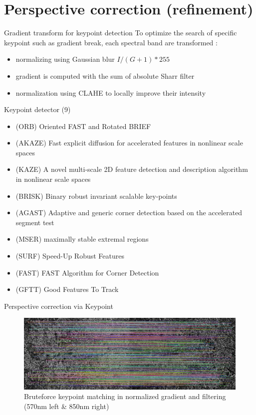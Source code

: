 \documentclass{beamer}
\begin{document}
	\section{Perspective correction (refinement)}
		\begin{frame}{Gradient transform for keypoint detection}
			To optimize the search of specific keypoint such as gradient break,
			each spectral band are transformed :
			\begin{itemize}
				\item normalizing using Gaussian blur $I/(G+1)*255$ 
				\item gradient is computed with the sum of absolute Sharr filter
				\item normalization using CLAHE to locally improve their intensity
			\end{itemize}
		\end{frame}
	
		\begin{frame}{Keypoint detector (9)}
			\begin{itemize}
				\item (ORB) Oriented FAST and Rotated BRIEF
				\item (AKAZE) Fast explicit diffusion for accelerated features in nonlinear scale spaces
				\item (KAZE) A novel multi-scale 2D feature detection and description algorithm in nonlinear scale spaces
				\item (BRISK) Binary robust invariant scalable key-points
				\item (AGAST) Adaptive and generic corner detection based on the accelerated segment test
				\item (MSER) maximally stable extremal regions
				\item (SURF) Speed-Up Robust Features
				\item (FAST) FAST Algorithm for Corner Detection
				\item (GFTT) Good Features To Track
			\end{itemize}
		\end{frame}
	
		\begin{frame}{Perspective correction via Keypoint}
			\begin{figure}
				\includegraphics[width=\linewidth]{../figures/prespective-feature-matching}
				\caption{Bruteforce keypoint matching in normalized gradient and filtering (570nm left \& 850nm right)}
			\end{figure}
		\end{frame}
	
\end{document}
